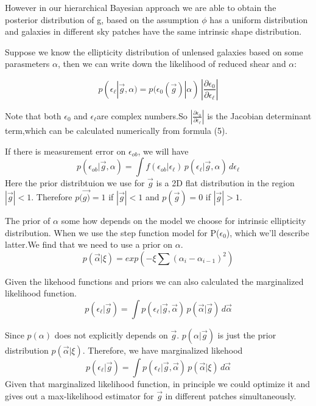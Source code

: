 \documentclass[useAMS,usenatbib]{mn2e}
\begin{document}
However in our hierarchical Bayesian approach we are able to obtain
the posterior distribution of g, based on the assumption $\phi$ has
a uniform distribution and galaxies in different sky patches have
the same intrinsic shape distribution.

Suppose we know the ellipticity distribution of unlensed galaxies
based on some parasmeters $\alpha$, then we can write down the likelihood
of reduced shear and $\alpha$:

\begin{equation}
p(\epsilon_{\ell}|\vec{g},\alpha)=p(\epsilon_{0}(\vec{g})|\alpha)\,|\frac{\partial\epsilon_{0}}{\partial\epsilon_{\ell}}|
\end{equation}



Note that both $\epsilon_{0}$ and $\epsilon_{\ell}$are complex numbers.So
$|\frac{\partial\epsilon_{0}}{\partial\epsilon_{\ell}}|$ is the Jacobian
determinant term,which can be calculated numerically from formula
(5).

If there is measurement error on $\epsilon_{ob}$, we will have 
\begin{equation}
p(\epsilon_{ob}|\vec{g},\alpha)=\int f(\epsilon_{ob}|\epsilon_{\ell})\, p(\epsilon_{\ell}|\vec{g},\alpha)\,d\epsilon_{\ell}
\end{equation}
Here the prior distribtuion we use for $\vec{g}$ is a 2D flat distribution
in the region $|\vec{g}|<1$. Therefore $p(\vec{g)}=1$ if $|\vec{g}|<1$
and $p(\vec{g})=0$ if $|\vec{g}|>1$.

The prior of $\alpha$ some how depends on the model we choose for
intrinsic ellipticity distribution. When we use the step function
model for P($\epsilon_{0}$), which we'll describe latter.We find that
we need to use a prior on $\alpha$. 
\begin{equation}
p(\vec{\alpha}|\xi)=exp(-\xi\sum(\alpha_{i}-\alpha_{i-1})^{2})
\end{equation}


Given the likehood functions and priors we can also calculated the
marginalized likelihood function. 
\begin{equation}
p(\epsilon_{\ell}|\vec{g})=\int p(\epsilon_{\ell}|\vec{g},\vec{\alpha})\,p(\vec{\alpha}|\vec{g})\,d\vec{\alpha}
\end{equation}


Since $p(\alpha)$ does not explicitly depends on $\vec{g}$. $p(\alpha|\vec{g})$ is
just the prior distribution $p(\vec{\alpha}|\xi)$. Therefore, we have
marginalized likehood 
\begin{equation}
p(\epsilon_{\ell}|\vec{g})=\int p(\epsilon_{\ell}|\vec{g},\vec{\alpha})\, p(\vec{\alpha}|\xi)\,d\vec{\alpha}
\end{equation}
Given that marginalized likelihood function, in principle we could
optimize it and gives out a max-likelihood estimator for $\vec{g}$
in different patches simultaneously.
\end{document}
